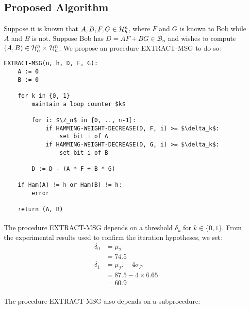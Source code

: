 \subsection{Proposed Algorithm}\label{proposed_algo}
\paragraph{}
Suppose it is known that $A, B, F, G \in \mathcal{H}_h^n$, where $F$ and $G$ is known to Bob while $A$ and $B$ is not. Suppose Bob has $D = AF + BG \in \mathcal{B}_n$ and wishes to compute $(A, B) \in \mathcal{H}_h^n \times \mathcal{H}_h^n$. We propose an procedure EXTRACT-MSG to do so:

\begin{lstlisting}[mathescape=true]
EXTRACT-MSG(n, h, D, F, G):
    A := 0
    B := 0
    
    for k in {0, 1}
        maintain a loop counter $k$
        
        for i: $\Z_n$ in {0, .., n-1}:
            if HAMMING-WEIGHT-DECREASE(D, F, i) >= $\delta_k$:
                set bit i of A
            if HAMMING-WEIGHT-DECREASE(D, G, i) >= $\delta_k$:
                set bit i of B
        
        D := D - (A * F + B * G)
    
    if Ham(A) != h or Ham(B) != h:
        error
    
    return (A, B)
\end{lstlisting}
\newpage

\paragraph{}
The procedure EXTRACT-MSG depends on a threshold $\delta_k$ for $k \in \{0, 1\}$. From the experimental results used to confirm the iteration hypotheses, we set:
\begin{align*}
    \delta_0 &= \mu_{\mathcal{I}}\\
    &= 74.5\\
    \delta_1 &= \mu_{\mathcal{I}'} - 4 \sigma_{\mathcal{I}'}\\
    &= 87.5 - 4 \times 6.65\\
    &= 60.9
\end{align*}

\paragraph{}
The procedure EXTRACT-MSG also depends on a subprocedure:

